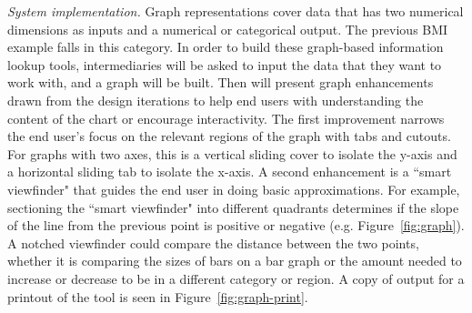 \documentclass{sig-alternate}
\begin{document}
\emph{System implementation.}
Graph representations cover data that has two numerical dimensions as inputs and a numerical or categorical output. The previous BMI example falls in this category. In order to build these graph-based information lookup tools, intermediaries will be asked to input the data that they want to work with, and a graph will be built. Then \nifty will present graph enhancements drawn from the design iterations to help end users with understanding the content of the chart or encourage interactivity. 
The first improvement narrows the end user's focus on the relevant regions of the graph with tabs and cutouts. For graphs with two axes, this is a vertical sliding cover to isolate the y-axis and a horizontal sliding tab to isolate the x-axis. 
A second enhancement is a ``smart viewfinder" that guides the end user in doing basic approximations. For example, sectioning the ``smart viewfinder" into different quadrants determines if the slope of the line from the previous point is positive or negative (e.g. Figure~\ref{fig:graph}). A notched viewfinder could compare the distance between the two points, whether it is comparing the sizes of bars on a bar graph or the amount needed to increase or decrease to be in a different category or region. A copy of output for a printout of the tool is seen in Figure~\ref{fig:graph-print}.

\end{document}
